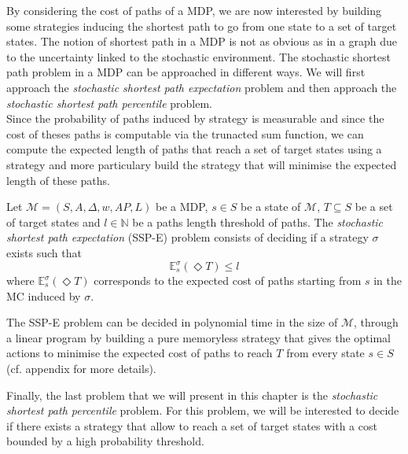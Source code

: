 By considering the cost of paths of a MDP, we are now interested by building some
strategies inducing the shortest path to go from one state to a set of target
states. The notion of shortest path in a MDP is not as obvious as in a graph due to the uncertainty linked to the stochastic environment.
The stochastic shortest path problem in a MDP can be approached in different
ways. We will first approach the \textit{stochastic shortest path expectation} problem and
then approach the \textit{stochastic shortest path percentile} problem. \\

Since the probability of paths induced by strategy is measurable and
since the cost of theses paths is computable via the trunacted sum function, we can
compute the expected length of paths that reach a set of target states using a strategy and more particulary build the strategy that will minimise the expected length of these paths.

\begin{definition}
Let $\mathcal{M}=(S, A, \Delta, w, AP, L)$ be a MDP, $s \in S$ be a state of $\mathcal{M}$,
$T \subseteq S$ be a set of target states and $l \in \mathbb{N}$ be a paths length
threshold of paths. The \textit{stochastic shortest path expectation} (SSP-E) problem
consists of deciding if a strategy $\sigma$ exists such that
\[
  \mathbb{E}^\sigma_s(\Diamond T) \leq l
\]
where $\mathbb{E}_s^\sigma(\Diamond T)$ corresponds to the expected cost of paths starting from $s$ in the MC induced by $\sigma$.
\end{definition}

\begin{theorem}
  The SSP-E problem can be decided in polynomial time in the size of $\mathcal{M}$, through a linear program by building a pure memoryless strategy that gives the optimal actions to minimise the expected cost of paths to reach $T$ from every state $s \in S$ (cf. appendix for more details).
\end{theorem}

Finally, the last problem that we will present in this chapter is the
\textit{stochastic shortest path percentile} problem. For this problem, we will
be interested to decide if there exists a strategy that allow to reach a set of target states with
a cost bounded by a high probability threshold.

